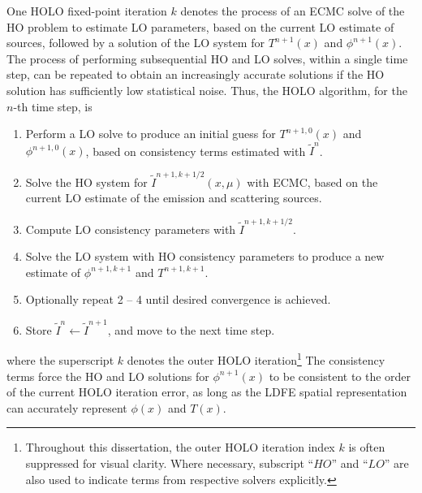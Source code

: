 One HOLO fixed-point iteration $k$ denotes the process of an ECMC solve of the HO problem to estimate LO parameters, based on
the current LO estimate of sources, followed by a solution of the 
LO system for $T^{n+1}(x)$ and $\phi^{n+1}(x)$.
The process of performing subsequential HO and LO solves, within a single time step,
can be repeated to obtain an increasingly accurate solutions if the HO solution has
sufficiently low statistical noise.  Thus, the HOLO algorithm, for the $n$-th time step, is
\begin{enumerate}
\item Perform a LO solve to produce an initial guess for $T^{n+1,0}(x)$
    and $\phi^{n+1,0}(x)$, based on consistency terms estimated with $\tilde{I}^{n}$.
\item Solve the HO system for $\tilde{I}^{n+1,k+1/2}(x,\mu)$ with ECMC, based on the current
    LO estimate of the emission and scattering sources.%
\item Compute LO consistency parameters with $\tilde{I}^{n+1,k+1/2}$.  
\item Solve the LO system with HO consistency parameters to produce a new
    estimate of $\phi^{n+1,k+1}$ and $T^{n+1,k+1}$.
\item Optionally repeat 2 -- 4 until desired convergence is achieved.
\item Store $\tilde{I}^{n}\leftarrow\tilde{I}^{n+1}$, and move to the next time step.
\end{enumerate}
where the superscript $k$ denotes the outer HOLO iteration\footnote{Throughout this
    dissertation, the outer HOLO iteration index $k$ is often suppressed for visual clarity.
    Where necessary, subscript ``$HO$'' and ``$LO$'' are also used to indicate terms from
respective solvers explicitly.}
The consistency terms force the HO
and LO solutions for $\phi^{n+1}(x)$ to be consistent to the order of the current HOLO
iteration error, as long as the LDFE spatial representation can accurately represent
$\phi(x)$ and $T(x)$.

